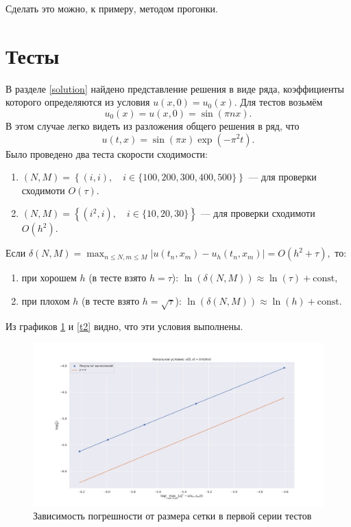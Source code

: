 \documentclass[14pt,a4paper]{extarticle}
\newcommand{\1}{\mathbbm{1}}
\begin{document}
Сделать это можно, к примеру, методом прогонки.

\section{Тесты}
В разделе \ref{solution} найдено представление решения в виде ряда, коэффициенты которого определяются из условия $u(x, 0) = u_0(x)$. 
Для тестов возьмём  
$$u_0(x) = u(x,0)=\sin(\pi n x) .$$ 
В этом случае легко видеть из разложения общего решения в ряд, что
$$ u(t, x) = \sin(\pi x) \exp{(-\pi^2 t)}. $$
Было проведено два теста скорости сходимости: 
\begin{enumerate}
    \item $(N, M) = \left\{(i, i), \quad i \in \{100, 200, 300, 400, 500\} \right\}$ --- для проверки сходимоти $O(\tau)$.
    \item $(N, M) = \left\{(i^2, i), \quad i \in \{10, 20, 30\} \right\}$ --- для проверки сходимоти $O(h^2)$.
\end{enumerate}
Если $\delta(N, M) = \max_{n\leq N, m \leq M} |u(t_n, x_m) - u_h(t_n, x_m)| = O(h^2 + \tau), $ то: 
\begin{enumerate}
    \item при хорошем $h$ (в тесте взято $h = \tau  $): $ \ln\left(\delta(N, M)\right) \approx \ln(\tau) + \text{const},$
    \item при плохом  $h$ (в тесте взято $h = \sqrt{\tau}$): $ \ln\left(\delta(N, M)\right) \approx \ln(h) + \text{const}.$
\end{enumerate}
Из графиков \ref{t1} и \ref{t2} видно, что эти условия выполнены. 

\begin{figure}
    \centering
    \includegraphics[scale=0.4]{figs/OrderCon1.pdf}
    \caption{Зависимость погрешности от размера сетки в первой серии тестов}
    \label{t1}
\end{figure}
\end{document}
